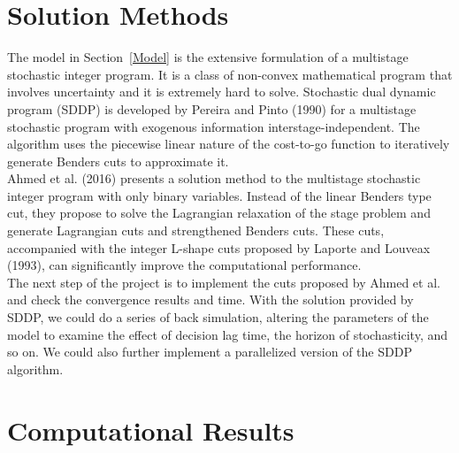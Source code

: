 \documentclass[12pt]{article}
\begin{document}
\section{Solution Methods}
	The model in Section~\ref{Model} is the extensive formulation of a multistage stochastic integer program. It is a class of non-convex mathematical program that involves uncertainty and it is extremely hard to solve. Stochastic dual dynamic program (SDDP) is developed by Pereira and Pinto (1990) for a multistage stochastic program with exogenous information interstage-independent. The algorithm uses the piecewise linear nature of the cost-to-go function to iteratively generate Benders cuts to approximate it.\\
	\newline Ahmed et al. (2016) presents a solution method to the multistage stochastic integer program with only binary variables. Instead of the linear Benders type cut, they propose to solve the Lagrangian relaxation of the stage problem and generate Lagrangian cuts and strengthened Benders cuts. These cuts, accompanied with the integer L-shape cuts proposed by Laporte and Louveax (1993), can significantly improve the computational performance.\\
	\newline The next step of the project is to implement the cuts proposed by Ahmed et al. and check the convergence results and time. With the solution provided by SDDP, we could do a series of back simulation, altering the parameters of the model to examine the effect of decision lag time, the horizon of stochasticity, and so on. We could also further implement a parallelized version of the SDDP algorithm.
	
\section{Computational Results}

\nocite{*}


\end{document}
